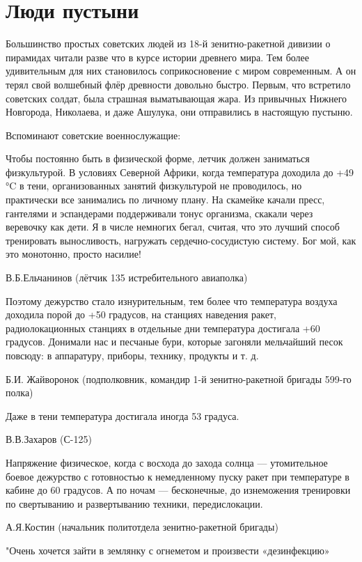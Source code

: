 \section{Люди пустыни}

Большинство простых советских людей из 18-й зенитно-ракетной дивизии о пирамидах читали разве что в курсе истории древнего мира. Тем более удивительным для них становилось соприкосновение с миром современным. А он терял свой волшебный флёр древности довольно быстро. Первым, что встретило советских солдат, была страшная выматывающая жара. Из привычных Нижнего Новгорода, Николаева, и даже Ашулука, они отправились в настоящую пустыню.

Вспоминают советские военнослужащие:
\begin{textcitation}
	Чтобы постоянно быть в физической форме, летчик должен заниматься физкультурой. В условиях Северной Африки, когда температура доходила до +49 °C в тени, организованных занятий физкультурой не проводилось, но практически все занимались по личному плану. На скамейке качали пресс, гантелями и эспандерами поддерживали тонус организма, скакали через веревочку как дети. Я в числе немногих бегал, считая, что это лучший способ тренировать выносливость, нагружать сердечно-сосудистую систему. Бог мой, как это монотонно, просто насилие! 
\end{textcitation}

В.Б.Ельчанинов (лётчик 135 истребительного авиаполка)
\begin{textcitation}
	Поэтому дежурство стало изнурительным, тем более что температура воздуха доходила порой до +50 градусов, на станциях наведения ракет, радиолокационных станциях в отдельные дни температура достигала +60 градусов. Донимали нас и песчаные бури, которые загоняли мельчайший песок повсюду: в аппаратуру, приборы, технику, продукты и т. д.
\end{textcitation}
Б.И. Жайворонок (подполковник, командир 1-й зенитно-ракетной бригады 599-го полка)
\begin{textcitation}
	Даже в тени температура достигала иногда 53 градуса.
\end{textcitation} 

В.В.Захаров (С-125)
\begin{textcitation}
	Напряжение физическое, когда с восхода до захода солнца — утомительное боевое дежурство с готовностью к немедленному пуску ракет при температуре в кабине до 60 градусов. А по ночам — бесконечные, до изнеможения тренировки по свертыванию и развертыванию техники, передислокации. 
\end{textcitation}
А.Я.Костин (начальник политотдела зенитно-ракетной бригады)
\begin{textcitation}
	"Очень хочется зайти в землянку с огнеметом и произвести «дезинфекцию»
\end{textcitation}

